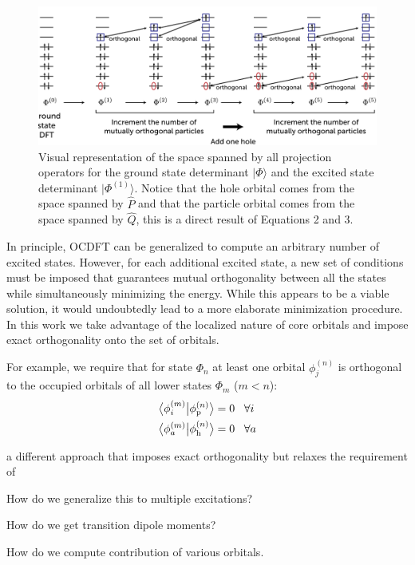 \documentclass[12pt]{article}
\newcommand{\braket}[3][0]
{\ifthenelse{\equal{#1}{0}}{\left\langle #2 \middle| #3 \right\rangle}
{\ifthenelse{\equal{#1}{1}}{\big\langle #2 \big| #3 \big\rangle}
{\ifthenelse{\equal{#1}{2}}{\Big\langle #2 \Big| #3 \Big\rangle}
{\ifthenelse{\equal{#1}{3}}{\bigg\langle #2 \bigg| #3 \bigg\rangle}
{\ifthenelse{\equal{#1}{4}}{\Bigg\langle #2 \Bigg| #3 \Bigg\rangle}
{Error}}}}}
}
\begin{document}
\begin{figure}
\includegraphics[width=16cm]{Figure2.pdf}
\caption{Visual representation of the space spanned by all projection operators for the ground state determinant $|\Phi\rangle$ and the excited state determinant $|\Phi^{(1)}\rangle$. Notice that the hole orbital comes from the space spanned by $\hat{P}$ and that the particle orbital comes from the space spanned by  $\hat{Q}$, this is a direct result of Equations 2 and 3.}
\label{fig:projection}
\end{figure}

In principle, OCDFT can be generalized to compute an arbitrary number of excited states.  However, for each additional excited state, a new set of conditions must be imposed that guarantees mutual orthogonality  between all the states while simultaneously minimizing the energy.
While this appears to be a viable solution, it would undoubtedly lead to a more elaborate minimization procedure.
In this work we take advantage of the localized nature of core orbitals and impose exact orthogonality onto the set of orbitals.


  For example, we require that for state $\Phi_n$ at least one orbital ${\phi^{(n)}_j}$ is orthogonal to the occupied orbitals of all lower states $\Phi_m$ ($m < n$):
\begin{align}
\braket[1]{\phi^{(m)}_i}{\phi^{(n)}_{\rm p}} &= 0 \;\;\; \forall i \\
\braket[1]{\phi^{(m)}_a}{\phi^{(n)}_{\rm h}} &= 0 \;\;\; \forall a
\end{align}

a different approach that imposes exact orthogonality but relaxes the requirement of 


How do we generalize this to multiple excitations?

How do we get transition dipole moments?

How do we compute contribution of various orbitals.
\end{document}
